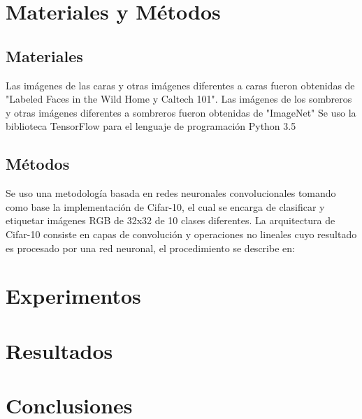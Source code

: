 \documentclass[10pt,twocolumn,letterpaper]{article}
\begin{document}

\section{Materiales y Métodos}
\subsection{Materiales}
Las imágenes de las caras y otras imágenes diferentes a caras fueron obtenidas de "Labeled Faces in the Wild Home y Caltech 101".
Las imágenes de los sombreros y otras imágenes diferentes a sombreros fueron obtenidas de "ImageNet"
Se uso la biblioteca TensorFlow para el lenguaje de programación Python 3.5

\subsection{Métodos}
Se uso una metodología basada en redes neuronales convolucionales tomando como base la implementación de Cifar-10, el cual se encarga de clasificar y etiquetar imágenes RGB de 32x32 de 10 clases diferentes. La arquitectura de Cifar-10 consiste en capas de convolución y operaciones no lineales cuyo resultado es procesado por una red neuronal, el procedimiento se describe en: %

\section{Experimentos}

\section{Resultados}

\section{Conclusiones}
\end{document}
